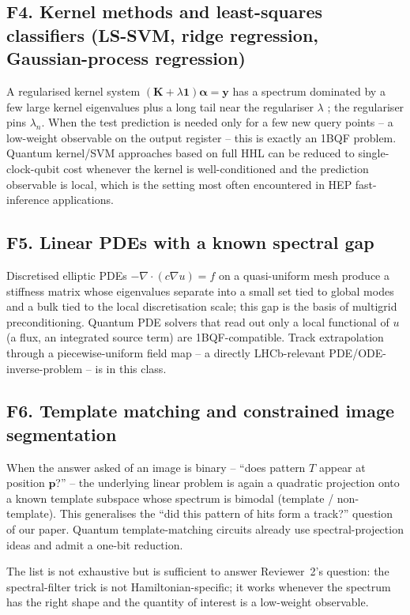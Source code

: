 \documentclass[11pt,a4paper]{article}
\newcommand{\OBQF}{\textsc{1BQF}}
\begin{document}
\subsection*{F4. Kernel methods and least-squares classifiers
(LS-SVM, ridge regression, Gaussian-process regression)}
A regularised kernel system $(\mathbf{K} + \lambda\mathbf{1})\boldsymbol\alpha
= \mathbf{y}$ has a spectrum dominated by a few large kernel
eigenvalues plus a long tail near the regulariser $\lambda$
\cite{Williams:2006}; the regulariser pins $\lambda_n$.  When the test
prediction is needed only for a few new query points -- a low-weight
observable on the output register -- this is exactly an \OBQF{} problem.
Quantum kernel/SVM approaches based on full HHL
\cite{Rebentrost:2014:qsvm} can be reduced to single-clock-qubit cost
whenever the kernel is well-conditioned and the prediction observable is
local, which is the setting most often encountered in HEP fast-inference
applications.

\subsection*{F5. Linear PDEs with a known spectral gap}
Discretised elliptic PDEs $-\nabla\cdot(c\nabla u) = f$ on a
quasi-uniform mesh produce a stiffness matrix whose eigenvalues separate
into a small set tied to global modes and a bulk tied to the local
discretisation scale; this gap is the basis of multigrid preconditioning.
Quantum PDE solvers \cite{Berry:2014:qode,Childs:2017,Berry:2017} that
read out only a local functional of $u$ (a flux, an integrated source
term) are \OBQF{}-compatible.  Track extrapolation through a
piecewise-uniform field map -- a directly LHCb-relevant
PDE/ODE-inverse-problem -- is in this class.

\subsection*{F6. Template matching and constrained image segmentation}
When the answer asked of an image is binary -- ``does pattern $T$
appear at position $\mathbf p$?'' -- the underlying linear problem is
again a quadratic projection onto a known template subspace whose
spectrum is bimodal (template / non-template).  This generalises the
``did this pattern of hits form a track?'' question of our paper.
Quantum template-matching circuits already use spectral-projection
ideas \cite{Cai:2015:templatematch} and admit a one-bit reduction.

\bigskip\noindent
The list is not exhaustive but is sufficient to answer Reviewer~2's
question: the spectral-filter trick is not Hamiltonian-specific; it
works whenever the spectrum has the right shape and the quantity of
interest is a low-weight observable.
\end{document}
